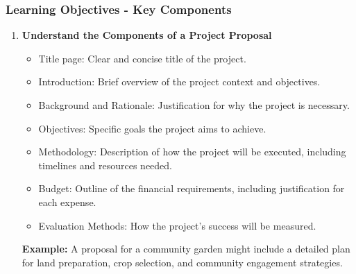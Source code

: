 \documentclass[aspectratio=169]{beamer}
\begin{document}
\begin{frame}[fragile]
    \frametitle{Learning Objectives - Key Components}
    \begin{enumerate}
        \item \textbf{Understand the Components of a Project Proposal}
            \begin{itemize}
                \item Title page: Clear and concise title of the project.
                \item Introduction: Brief overview of the project context and objectives.
                \item Background and Rationale: Justification for why the project is necessary.
                \item Objectives: Specific goals the project aims to achieve.
                \item Methodology: Description of how the project will be executed, including timelines and resources needed.
                \item Budget: Outline of the financial requirements, including justification for each expense.
                \item Evaluation Methods: How the project's success will be measured.
            \end{itemize}
            \textbf{Example:} A proposal for a community garden might include a detailed plan for land preparation, crop selection, and community engagement strategies.
    \end{enumerate}
\end{frame}
\end{document}
